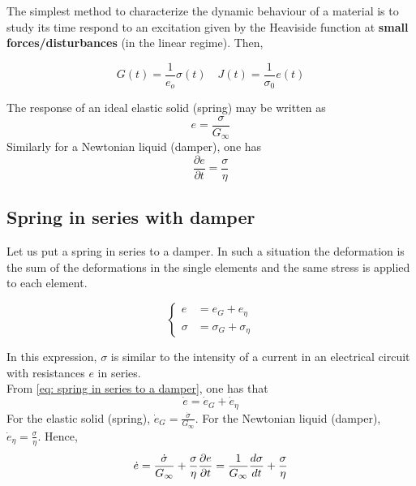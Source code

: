\documentclass[../phys-f308.tex]{subfiles}
\begin{document}
    The simplest method to characterize the dynamic behaviour of a material is to study its time respond to an excitation given by the Heaviside function at \textbf{small forces/disturbances} (in the linear regime). Then,

    \begin{equation}
        G(t) = \frac{1}{e_o}\sigma(t) \quad J(t) = \frac{1}{\sigma_0}e(t)
    \end{equation}


    The response of an ideal elastic solid (spring) may be written as
    \begin{equation}
        e = \frac{\sigma}{G_\infty}
    \end{equation}
    Similarly for a Newtonian liquid (damper), one has
    \begin{equation}
        \frac{\partial e}{\partial t} = \frac{\sigma}{\eta}
    \end{equation}

    \subsection{Spring in series with damper}

    Let us put a spring in series to a damper. In such a situation the deformation is the sum of the deformations in the single elements and the same stress is applied to each element.

    \begin{equation}
        \begin{cases}
            e &= e_G+e_\eta\\
            \sigma &= \sigma_G+\sigma_\eta
        \end{cases}
        \label{eq: spring in series to a damper}
    \end{equation}

    In this expression, $\sigma$ is similar to the intensity of a current in an electrical circuit with resistances $e$ in series.\\

    From \eqref{eq: spring in series to a damper}, one has that
    \begin{equation}
        \dot{e} = \dot{e}_G+\dot{e}_\eta
    \end{equation}
    For the elastic solid (spring), $\dot{e}_G = \frac{\dot{\sigma}}{G_\infty}$. For the Newtonian liquid (damper), $\dot{e}_\eta = \frac{\sigma}{\eta}$. Hence,
    \begin{equation}
        \dot{e} = \frac{\dot{\sigma}}{G_\infty}+\frac{\sigma}{\eta}\\
        \frac{\partial e}{\partial t} = \frac{1}{G_\infty}\frac{d\sigma}{dt}+\frac{\sigma}{\eta}
    \end{equation}
\end{document}
